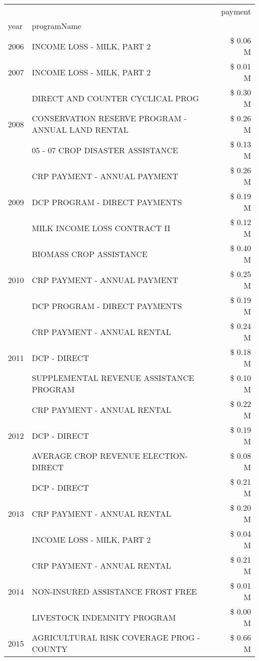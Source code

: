 \begin{tabular}{llr}
\toprule
 &  & payment \\
year & programName &  \\
\midrule
2006 & INCOME LOSS - MILK, PART 2 & \$ 0.06 M \\
\cline{1-3}
2007 & INCOME LOSS - MILK, PART 2 & \$ 0.01 M \\
\cline{1-3}
\multirow[t]{3}{*}{2008} & DIRECT AND COUNTER CYCLICAL PROG & \$ 0.30 M \\
 & CONSERVATION RESERVE PROGRAM - ANNUAL LAND RENTAL & \$ 0.26 M \\
 & 05 - 07 CROP DISASTER ASSISTANCE & \$ 0.13 M \\
\cline{1-3}
\multirow[t]{3}{*}{2009} & CRP PAYMENT - ANNUAL PAYMENT & \$ 0.26 M \\
 & DCP PROGRAM - DIRECT PAYMENTS & \$ 0.19 M \\
 & MILK INCOME LOSS CONTRACT II & \$ 0.12 M \\
\cline{1-3}
\multirow[t]{3}{*}{2010} & BIOMASS CROP ASSISTANCE & \$ 0.40 M \\
 & CRP PAYMENT - ANNUAL PAYMENT & \$ 0.25 M \\
 & DCP PROGRAM - DIRECT PAYMENTS & \$ 0.19 M \\
\cline{1-3}
\multirow[t]{3}{*}{2011} & CRP PAYMENT - ANNUAL RENTAL & \$ 0.24 M \\
 & DCP - DIRECT & \$ 0.18 M \\
 & SUPPLEMENTAL REVENUE ASSISTANCE PROGRAM & \$ 0.10 M \\
\cline{1-3}
\multirow[t]{3}{*}{2012} & CRP PAYMENT - ANNUAL RENTAL & \$ 0.22 M \\
 & DCP - DIRECT & \$ 0.19 M \\
 & AVERAGE CROP REVENUE ELECTION-DIRECT & \$ 0.08 M \\
\cline{1-3}
\multirow[t]{3}{*}{2013} & DCP - DIRECT & \$ 0.21 M \\
 & CRP PAYMENT - ANNUAL RENTAL & \$ 0.20 M \\
 & INCOME LOSS - MILK, PART 2 & \$ 0.04 M \\
\cline{1-3}
\multirow[t]{3}{*}{2014} & CRP PAYMENT - ANNUAL RENTAL & \$ 0.21 M \\
 & NON-INSURED ASSISTANCE FROST FREE & \$ 0.01 M \\
 & LIVESTOCK INDEMNITY PROGRAM & \$ 0.00 M \\
\cline{1-3}
\multirow[t]{3}{*}{2015} & AGRICULTURAL RISK COVERAGE PROG - COUNTY & \$ 0.66 M \\

\end{tabular}
